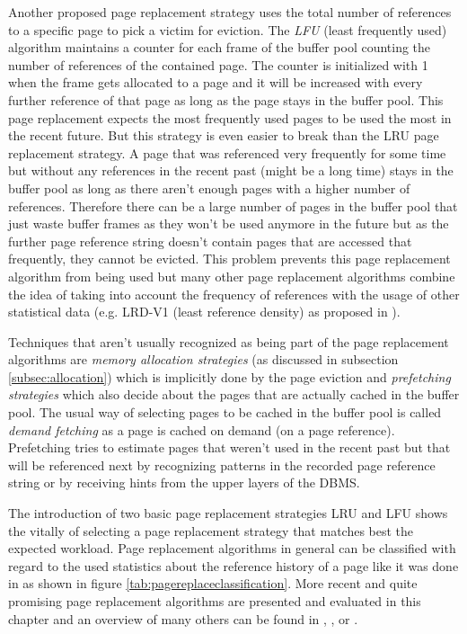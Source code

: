    Another proposed page replacement strategy uses the total number of references to a specific page to pick a victim for eviction. The \emph{LFU} (least frequently used) algorithm maintains a counter for each frame of the buffer pool counting the number of references of the contained page. The counter is initialized with \num{1} when the frame gets allocated to a page and it will be increased with every further reference of that page as long as the page stays in the buffer pool. This page replacement expects the most frequently used pages to be used the most in the recent future. But this strategy is even easier to break than the LRU page replacement strategy. A page that was referenced very frequently for some time but without any references in the recent past (might be a long time) stays in the buffer pool as long as there aren't enough pages with a higher number of references. Therefore there can be a large number of pages in the buffer pool that just waste buffer frames as they won't be used anymore in the future but as the further page reference string doesn't contain pages that are accessed that frequently, they cannot be evicted. This problem prevents this page replacement algorithm from being used but many other page replacement algorithms combine the idea of taking into account the frequency of references with the usage of other statistical data (e.g. LRD-V1 (least reference density) as proposed in \cite{Effelsberg:1984}).

        Techniques that aren't usually recognized as being part of the page replacement algorithms are \emph{memory allocation strategies} (as discussed in subsection \ref{subsec:allocation}) which is implicitly done by the page eviction and \emph{prefetching strategies} which also decide about the pages that are actually cached in the buffer pool. The usual way of selecting pages to be cached in the buffer pool is called \emph{demand fetching} as a page is cached on demand (on a page reference). Prefetching tries to estimate pages that weren't used in the recent past but that will be referenced next by recognizing patterns in the recorded page reference string or by receiving hints from the upper layers of the DBMS.

    The introduction of two basic page replacement strategies LRU and LFU shows the vitally of selecting a page replacement strategy that matches best the expected workload. Page replacement algorithms in general can be classified with regard to the used statistics about the reference history of a page like it was done in \cite{Effelsberg:1984} as shown in figure \ref{tab:pagereplaceclassification}. More recent and quite promising page replacement algorithms are presented and evaluated in this chapter and an overview of many others can be found in \cite{Datenbanksysteme_-_Konzepte_und_Techniken_der_Implementierung}, \cite{Datenbanken_-_Implementierungstechniken}, \cite{Wenguang:2001} or \cite{Paajanen:2007}.

